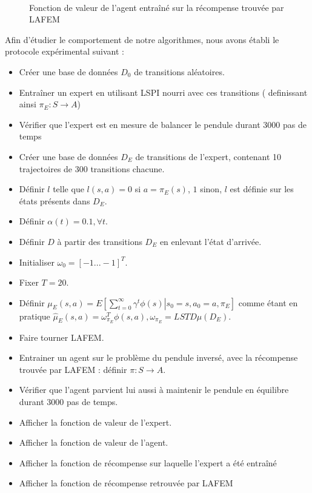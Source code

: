 \documentclass[publibook-draft]{CAp2012}
\begin{document}
{\begin{figure}
\begin{minipage}[t]{.4\linewidth}
\begin{center}
       \caption{Fonction de valeur de l'agent entraîné sur la récompense trouvée par LAFEM}
       \label{lafemV.fig}
    \end{center}
\end{minipage}\\
\end{figure}
Afin d'étudier le comportement de notre algorithmes, nous avons établi le protocole expérimental suivant :
\begin{itemize}
 \item Créer une base de données $D_0$ de transitions aléatoires.
 \item Entraîner un expert en utilisant LSPI nourri avec ces transitions ( definissant ainsi $\pi_E : S\rightarrow A$)
 \item Vérifier que l'expert est en mesure de balancer le pendule durant 3000 pas de temps
 \item Créer une base de données $D_E$ de transitions de l'expert, contenant 10 trajectoires de 300 transitions chacune.
 \item Définir $l$ telle que $l(s,a) = 0$ si $a=\pi_E(s)$, $1$ sinon, $l$ est définie sur les états présents dans $D_E$.
 \item Définir $\alpha(t) = 0.1,\forall t$.
 \item Définir $D$ à partir des transitions $D_E$ en enlevant l'état d'arrivée.
 \item Initialiser $\omega_0 = [-1...-1]^T$.
 \item Fixer $T=20$.
 \item Définir $\mu_E(s,a) = E\left.\left[\sum\limits_{t=0}^\infty \gamma^t \phi(s)\right|s_0 = s, a_0 = a, \pi_E\right]$ comme étant en pratique $\hat\mu_E(s,a) =  \omega^T_{\pi_E}\phi(s,a), \omega_{\pi_E} = LSTD\mu(D_E)$.
 \item Faire tourner LAFEM.
 \item Entrainer un agent sur le problème du pendule inversé, avec la récompense trouvée par LAFEM : définir $\pi : S\rightarrow A$.
 \item Vérifier que l'agent parvient lui aussi à maintenir le pendule en équilibre durant 3000 pas de temps.
 \item Afficher la fonction de valeur de l'expert.
 \item Afficher la fonction de valeur de l'agent.
 \item Afficher la fonction de récompense sur laquelle l'expert a été entraîné
 \item Afficher la fonction de récompense retrouvée par LAFEM
\end{itemize}

}
\end{document}
